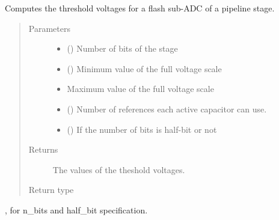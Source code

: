 \documentclass[letterpaper,10pt,english]{sphinxmanual}
\begin{document}

\begin{fulllineitems}
\label{\detokenize{gen:calib.gen.compute_thres}}
Computes the threshold voltages for a flash sub-ADC of a pipeline stage.
\begin{quote}\begin{description}
\item[{Parameters}] \leavevmode\begin{itemize}
\item {} 
 (\sphinxstyleliteralemphasis{\sphinxupquote{, }}\sphinxstyleliteralemphasis{\sphinxupquote{, }}) \textendash{} Number of bits of the stage

\item {} 
 () \textendash{} Minimum value of the full voltage scale

\item {} 
 \textendash{} Maximum value of the full voltage scale

\item {} 
 () \textendash{} Number of references each active capacitor can use.

\item {} 
 () \textendash{} If the number of bits is half-bit or not

\end{itemize}

\item[{Returns}] \leavevmode
The values of the theshold voltages.

\item[{Return type}] \leavevmode
{}

\end{description}\end{quote}




{\hyperref[\detokenize{gen:calib.gen.parse_bits}]{}}, for n\_bits and half\_bit specification.



\end{fulllineitems}
\end{document}
